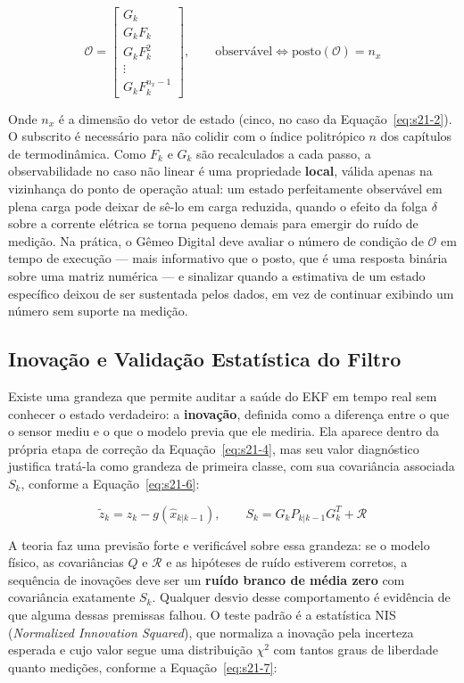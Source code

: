 \documentclass[12pt,a4paper]{article}
\numberwithin{equation}{section}
\numberwithin{table}{section}
\numberwithin{figure}{section}
\begin{document}
	\begin{equation}\label{eq:s21-5}
	\mathcal{O} = \begin{bmatrix} G_k \\ G_k F_k \\ G_k F_k^2 \\ \vdots \\ G_k F_k^{n_x-1} \end{bmatrix}, \qquad \text{observável} \iff \text{posto}(\mathcal{O}) = n_x
\end{equation}

	Onde $n_x$ é a dimensão do vetor de estado (cinco, no caso da Equação~\eqref{eq:s21-2}). O subscrito é necessário para não colidir com o índice politrópico $n$ dos capítulos de termodinâmica. Como $F_k$ e $G_k$ são recalculados a cada passo, a observabilidade no caso não linear é uma propriedade \textbf{local}, válida apenas na vizinhança do ponto de operação atual: um estado perfeitamente observável em plena carga pode deixar de sê-lo em carga reduzida, quando o efeito da folga $\delta$ sobre a corrente elétrica se torna pequeno demais para emergir do ruído de medição. Na prática, o Gêmeo Digital deve avaliar o número de condição de $\mathcal{O}$ em tempo de execução — mais informativo que o posto, que é uma resposta binária sobre uma matriz numérica — e sinalizar quando a estimativa de um estado específico deixou de ser sustentada pelos dados, em vez de continuar exibindo um número sem suporte na medição.

	\subsection{Inovação e Validação Estatística do Filtro}

	Existe uma grandeza que permite auditar a saúde do EKF em tempo real sem conhecer o estado verdadeiro: a \textbf{inovação}, definida como a diferença entre o que o sensor mediu e o que o modelo previa que ele mediria. Ela aparece dentro da própria etapa de correção da Equação~\eqref{eq:s21-4}, mas seu valor diagnóstico justifica tratá-la como grandeza de primeira classe, com sua covariância associada $S_k$, conforme a Equação~\eqref{eq:s21-6}:

	\begin{equation}\label{eq:s21-6}
	\tilde{z}_k = z_k - g(\hat{x}_{k|k-1}), \qquad S_k = G_k P_{k|k-1} G_k^T + \mathcal{R}
\end{equation}

	A teoria faz uma previsão forte e verificável sobre essa grandeza: se o modelo físico, as covariâncias $Q$ e $\mathcal{R}$ e as hipóteses de ruído estiverem corretos, a sequência de inovações deve ser um \textbf{ruído branco de média zero} com covariância exatamente $S_k$. Qualquer desvio desse comportamento é evidência de que alguma dessas premissas falhou. O teste padrão é a estatística NIS (\textit{Normalized Innovation Squared}), que normaliza a inovação pela incerteza esperada e cujo valor segue uma distribuição $\chi^2$ com tantos graus de liberdade quanto medições, conforme a Equação~\eqref{eq:s21-7}:
\end{document}
